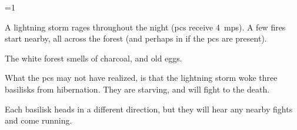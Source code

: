 
\ifnum\value{cycle}=1

  A lightning storm rages throughout the night (\glspl{pc} receive 4~\glspl{mp}).
  A few fires start nearby, all across the forest (and perhaps in  if the \glspl{pc} are present).

  \begin{boxtext}
    The white forest smells of charcoal, and old eggs.
  \end{boxtext}

  What the \glspl{pc} may not have realized, is that the lightning storm woke three \glspl{basilisk} from hibernation.
  They are starving, and will fight to the death.

  Each \gls{basilisk} heads in a different direction, but they will hear any nearby fights and come running.
  

\fi



